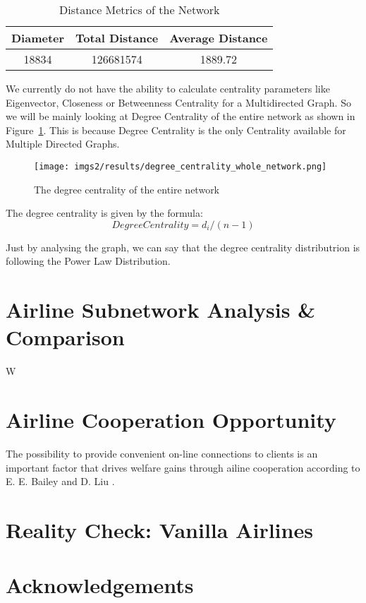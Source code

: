 \documentclass[twocolumn]{tum-article}
\begin{document}
\begin{center}
\begin{table}[ht]	
 \begin{tabular}{| c | c | c |}
 \hline
 Diameter & Total Distance & Average Distance \\ [0.5ex]
 \hline
 18834 & 126681574 & 1889.72 \\
 \hline
 \end{tabular}
\caption{Distance Metrics of the Network}
\label{Tab:distance_metrics}	 
\end{table}
\end{center}

We currently do not have the ability to calculate centrality parameters like Eigenvector, Closeness or Betweenness Centrality for a Multidirected Graph. So we will be mainly looking at Degree Centrality of the entire network as shown in Figure~\ref{fig:degree_centrality}.
This is because Degree Centrality is the only Centrality available for Multiple Directed Graphs.

\begin{figure}
        \centering
        \texttt{[image: imgs2/results/degree\_centrality\_whole\_network.png]}
        \caption{
The degree centrality of the entire network}
        \label{fig:degree_centrality}
\end{figure}

The degree centrality is given by the formula:
\begin{equation}
	Degree Centrality=d_i/(n-1)
\end{equation}

Just by analysing the graph, we can say that the degree centrality distributrion is following the Power Law Distribution. 

\section{Airline Subnetwork Analysis \& Comparison}
W

\section{Airline Cooperation Opportunity}

The possibility to provide convenient on-line connections to clients is an important factor that drives welfare gains through ailine cooperation according to E. E. Bailey and D. Liu \cite{airline_consolidation_and_consumer_welfare}.

\section{Reality Check: Vanilla Airlines}


\section*{Acknowledgements}




\end{document}
